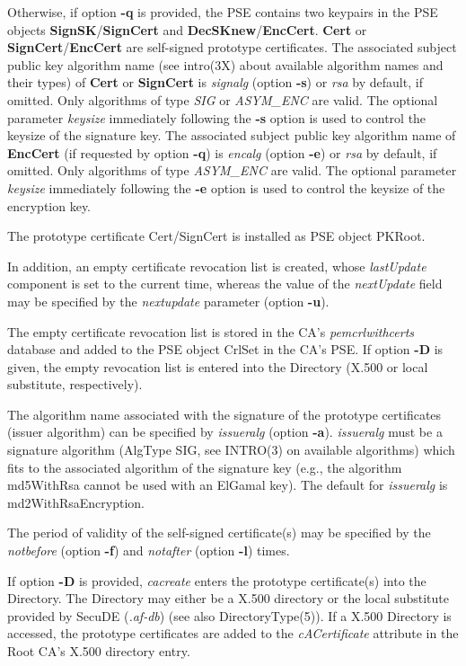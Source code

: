 Otherwise, if option {\bf -q} is provided, the PSE contains two keypairs 
in the PSE objects {\bf SignSK}/{\bf SignCert} and {\bf DecSKnew}/{\bf EncCert}. {\bf Cert} or 
{\bf SignCert}/{\bf EncCert} are self-signed prototype certificates.
The associated subject public key algorithm name (see intro(3X) about available 
algorithm names and their types) of {\bf Cert} or {\bf SignCert} is {\em signalg} (option {\bf -s}) or {\em rsa} 
by default, 
if omitted. Only algorithms of type {\em SIG} or {\em ASYM\_ENC} are valid. The optional
parameter {\em keysize} immediately following the {\bf -s} option is used to control
the keysize of the signature key.
The associated subject public key algorithm name of {\bf EncCert} (if requested by option {\bf -q})
is {\em encalg} (option {\bf -e}) or {\em rsa} by default, 
if omitted. Only algorithms of type {\em ASYM\_ENC} are valid. The optional
parameter {\em keysize} immediately following the {\bf -e} option is used to control
the keysize of the encryption key.

The prototype certificate Cert/SignCert is installed as PSE object PKRoot.

In addition, an empty certificate revocation list is created, whose {\em lastUpdate} component is set to the 
current time, whereas the value of the {\em nextUpdate} field may be specified by the {\em nextupdate} parameter (option {\bf -u}).

The empty certificate revocation list is stored in the CA's {\em pemcrlwithcerts} database 
and added to the 
PSE object CrlSet in the CA's PSE.
If option {\bf -D} is given, the empty revocation list is entered into the Directory 
(X.500 or local substitute, respectively).

The algorithm name associated with the signature of the prototype certificates 
(issuer algorithm) can be specified by {\em issueralg} 
(option {\bf -a}). {\em issueralg} must be a
signature algorithm (AlgType SIG, see INTRO(3) on available algorithms) which fits to the associated 
algorithm of the signature key (e.g., the algorithm md5WithRsa cannot be used with an ElGamal key).
The default for {\em issueralg} is md2WithRsaEncryption.
 
The period of validity of the self-signed certificate(s) may be specified by the
{\em notbefore} (option {\bf -f}) and {\em notafter} (option {\bf -l}) times.

If option {\bf -D} is provided, {\em cacreate} enters the prototype certificate(s)
into the Directory. 
The Directory may either be a X.500 directory or the local substitute provided by 
SecuDE ({\em .af-db}) (see also DirectoryType(5)).
If a X.500 Directory is accessed, the prototype certificates are added to the {\em cACertificate} 
attribute in the Root CA's X.500 directory entry.

